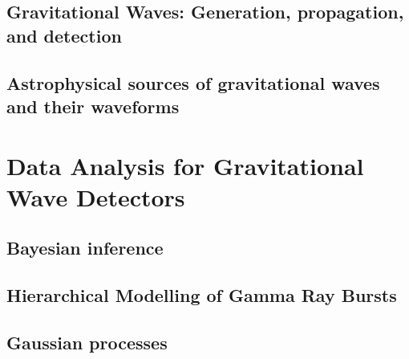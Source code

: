 \documentclass{kentigern}
\theoremstyle{definition}
\begin{document}
\mainmatter
\chapter{Gravitational Waves: Generation, propagation, and detection}
\label{chapter:intro}




\chapter{Astrophysical sources of gravitational waves and their waveforms}
 \label{cha:sourc-grav-waves}
 

 

\part{Data Analysis for Gravitational Wave Detectors}
\label{part:data-analysis}
 
\chapter{Bayesian inference}
\label{cha:bayesian-inference}




\chapter{Hierarchical Modelling of Gamma Ray Bursts}
\label{cha:gamma-ray-burst}



\chapter{Gaussian processes}
\label{cha:gaussian-process}
\end{document}
